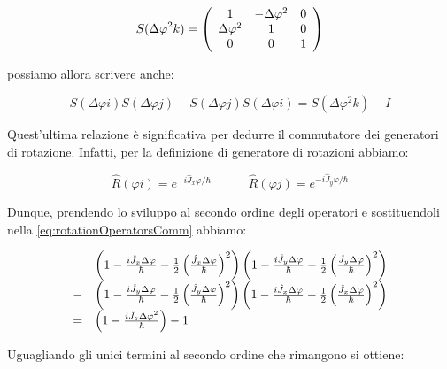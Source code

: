 	\begin{equation}
		S(\Delta \varphi^2 k) = 
		\left ( \begin{array}{c c c}
			1 & - \Delta \varphi^2 & 0\\
			\Delta \varphi^2 & 1 & 0 \\
			0 & 0 & 1 \\
		\end{array} \right )
	\end{equation}

possiamo allora scrivere anche:

	\begin{equation} \label{eq:rotationOperatorsComm}
		S(\Delta \varphi i) S(\Delta \varphi j) - S(\Delta \varphi j) S(\Delta \varphi i) = S(\Delta \varphi^2 k) - I
	\end{equation}

Quest'ultima relazione \`e significativa per dedurre il commutatore dei generatori di rotazione. Infatti, per la definizione di generatore di rotazioni abbiamo:

	\begin{equation}
		\hat{R} ( \varphi i ) = e^{-i \hat{J}_x \varphi / \hbar } \quad \quad
		\quad \hat{R} ( \varphi j ) = e^{-i \hat{J}_y \varphi / \hbar } 
	\end{equation}

Dunque, prendendo lo sviluppo al secondo ordine degli operatori e sostituendoli nella \eqref{eq:rotationOperatorsComm} abbiamo:

	\begin{equation}
		\begin{array}{r l}
		& \left ( 1 - \frac{i \hat{J}_x \Delta \varphi}{\hbar} - \frac{1}{2} \left ( \frac{\hat{J}_x \Delta \varphi}{\hbar} \right ) ^ 2 \right ) \left ( 1 - \frac{i \hat{J}_y \Delta \varphi}{\hbar} - \frac{1}{2} \left ( \frac{\hat{J}_y \Delta \varphi}{\hbar} \right ) ^ 2 \right ) \\
		- & \left ( 1 - \frac{i \hat{J}_y \Delta \varphi}{\hbar} - \frac{1}{2} \left ( \frac{\hat{J}_y \Delta \varphi}{\hbar} \right ) ^ 2 \right ) \left ( 1 - \frac{i \hat{J}_x \Delta \varphi}{\hbar} - \frac{1}{2} \left ( \frac{\hat{J}_x \Delta \varphi}{\hbar} \right ) ^ 2 \right ) \\ 
		= & \left ( 1 - \frac{i \hat{J}_z \Delta \varphi^2}{\hbar} \right ) - 1
		\end{array}
	\end{equation}

Uguagliando gli unici termini al secondo ordine che rimangono si ottiene:

